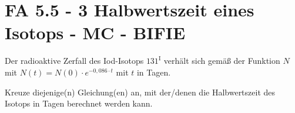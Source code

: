 \section{FA 5.5 - 3 Halbwertszeit eines Isotops - MC - BIFIE}

\begin{beispiel}[FA 5.5]{1} %
Der radioaktive Zerfall des Iod-Isotops ${131}^\text{I}$ verhält sich gemäß der Funktion $N$ mit $N(t)=N(0)\cdot e^{-0,086\cdot t}$ mit $t$ in Tagen. 

\leer

Kreuze diejenige(n) Gleichung(en) an, mit der/denen die Halbwertszeit des Isotops in Tagen berechnet werden kann.

\end{beispiel}